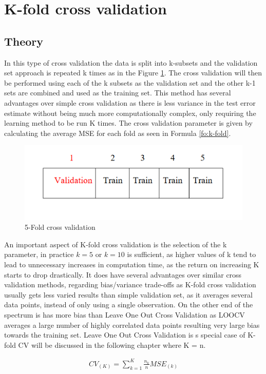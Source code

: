 \section {K-fold cross validation}%
\subsection{Theory}
In this type of cross validation the data is split into k-subsets and the validation set approach is repeated k times as in the Figure \ref{fig:5-flod}. The cross validation will then be performed using each of the k subsets as the validation set and the other k-1 sets are combined and used as the training set. This method has several advantages over simple cross validation as there is less variance in the test error estimate without being much more computationally complex, only requiring the learning method to be run K times. The cross validation parameter is given by calculating the average MSE for each fold as seen in Formula \ref{fo:k-fold}. 

\begin{figure}[H]
	\centering
	\includegraphics[width=0.5\linewidth]{crossValidation/5-foldCV}
	\caption{5-Fold cross validation}
	\label{fig:5-flod}
\end{figure}

An important aspect of K-fold cross validation is the selection of the k parameter, in practice $k=5$ or $k=10$ is sufficient, as higher values of k tend to lead to unnecessary increases in computation time, as the return on increasing K starts to drop drastically. It does have several advantages over similar cross validation methods, regarding bias/variance trade-offs as K-fold cross validation usually gets less varied results than simple validation set, as it averages several data points, instead of only using a single observation. On the other end of the spectrum is has more bias than Leave One Out Cross Validation as LOOCV averages a large number of highly correlated data points resulting very large bias towards the training set. Leave One Out Cross Validation is s special case of K-fold CV will be discussed in the following chapter where K = n.

\begin{align}\label{fo:k-fold}
CV_{(K)} = \sum_{k=1}^{K}  \frac {n_{k}}{n}MSE_{(k)}
\end{align}

